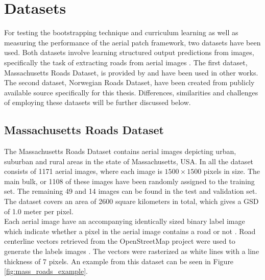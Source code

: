 \section{Datasets}
\label{sec:datasets}
For testing the bootstrapping technique and curriculum learning as well as measuring the performance of the aerial patch framework, two datasets have been used. Both datasets involve learning structured output predictions from images, specifically the task of extracting roads from aerial images . The first dataset, Massachusetts Roads Dataset, is provided by \cite{MnihThesis} and have been used in other works. The second dataset, Norwegian Roads Dataset, have been created from publicly available source specifically for this thesis. Differences, similarities and challenges of employing these datasets will be further discussed below.\\

\subsection{Massachusetts Roads Dataset}
The Massachusetts Roads Dataset contains aerial images depicting urban, suburban and rural areas in the state of Massachusetts, USA. In all the dataset consists of 1171 aerial images, where each image is $1500\times 1500$ pixels in size. The main bulk, or 1108 of these images have been randomly assigned to the training set. The remaining 49 and 14 images can be found in the test and validation set. The dataset covers an area of 2600 square kilometers in total, which gives a \ac{GSD} of 1.0 meter per pixel.\\

Each aerial image have an accompanying identically sized binary label image which indicate whether a pixel in the aerial image contains a road or not . Road centerline vectors retrieved from the OpenStreetMap project were used to generate the labels images \citep{MnihThesis}. The vectors were rasterized as white lines with a line thickness of 7 pixels. An example from this dataset can be seen in Figure \ref{fig:mass_roads_example}.  \\


